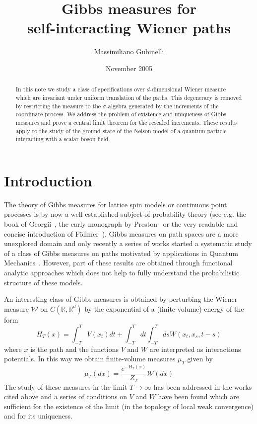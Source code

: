 \documentclass[a4paper,12pt,reqno]{amsart}
\newcommand{\R}{\mathbb{R}}
\newcommand{\W}{\mathcal{W}}
\begin{document}
\title[Gibbs measures on Wiener paths]
{Gibbs measures for \\self-interacting Wiener paths}
\author{Massimiliano Gubinelli} 
\address{Dip. di Matematical Applicata ``U.Dini'' -- Universit\`a di
Pisa\\ via Bonanno 25b\\
56125 Pisa - Italia.}
\date{November 2005}


\begin{abstract}
In this note we study a class of specifications over $d$-dimensional
Wiener measure which are invariant under uniform translation of
the paths. This degeneracy is removed by restricting the measure to the
$\sigma$-algebra generated by the increments of the coordinate process.
We address the problem of existence and uniqueness of Gibbs measures
 and prove a  central limit theorem for the rescaled increments. 
These results apply to the study of the ground state
 of the Nelson model of a quantum particle
interacting with a scalar boson field.
\end{abstract}

\maketitle
\section{Introduction}
The theory of Gibbs measures for lattice spin models or continuous
point processes is by now a well established subject of probability
theory (see e.g. the book of Georgii~\cite{Georgii}, the early
monograph by Preston~\cite{Preston} or the very readable and concise introduction of
F\"ollmer~\cite{Follmer}). Gibbs measures on  path spaces
are a more unexplored domain and only recently a series of works
started a systematic study of a class of Gibbs measures on  paths 
motivated by applications in Quantum
Mechanics~\cite{BLS,BHLMS02,BetzLor03,Betz03}. However, part of these results
are obtained through functional analytic approaches which does not help
to fully understand the probabilistic structure of these models.

An interesting class of Gibbs measures is obtained by
perturbing the Wiener measure $\W$ on $C(\R,\R^d)$ by the exponential
of a (finite-volume)  energy of the form
$$
H_T(x) = \int_{-T}^T V(x_t) dt + \int_{-T}^T dt \int_{-T}^T ds W(x_t,x_s,t-s)
$$
where $x$ is the path and the functions $V$ and $W$ are 
interpreted as interactions potentials. In this way we obtain
finite-volume measures $\mu_T$ given by
\begin{equation}
 \mu_T(dx) = \frac{e^{-H_T(x)}}{Z_T} \W(dx) 
\end{equation}
The study of these measures in the limit $T \to \infty$ has been
addressed in the works cited above and a series of conditions on $V$
and $W$ have been found which are sufficient for the existence of the
limit (in the topology of local weak convergence) and for its
uniqueness.  
\end{document}

